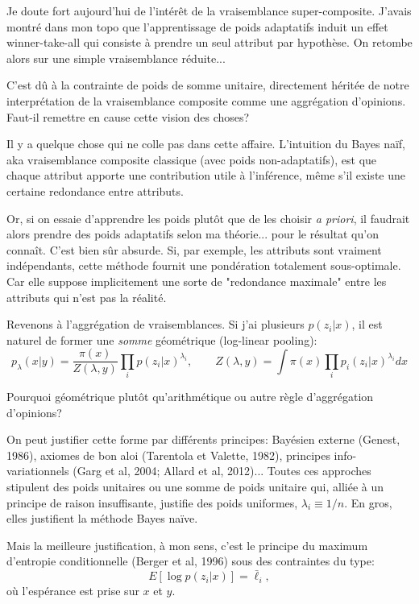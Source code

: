 \documentclass{article}
\begin{document}
Je doute fort aujourd'hui de l'int\'er\^et de la vraisemblance super-composite. J'avais montr\'e dans mon topo que l'apprentissage de poids adaptatifs induit un effet winner-take-all qui consiste \`a prendre un seul attribut par hypoth\`ese. On retombe alors sur une simple vraisemblance r\'eduite... 

C'est d\^u \`a la contrainte de poids de somme unitaire, directement h\'erit\'ee de notre interpr\'etation de la vraisemblance composite comme une aggr\'egation d'opinions. Faut-il remettre en cause cette vision des choses? 

Il y a quelque chose qui ne colle pas dans cette affaire. L'intuition du Bayes na\"if, aka vraisemblance composite classique (avec poids non-adaptatifs), est que chaque attribut apporte une contribution utile \`a l'inf\'erence, m\^eme s'il existe une certaine redondance entre attributs. 

Or, si on essaie d'apprendre les poids plut\^ot que de les choisir {\em a priori}, il faudrait alors prendre des poids adaptatifs selon ma th\'eorie... pour le r\'esultat qu'on conna\^it. C'est bien s\^ur absurde. Si, par exemple, les attributs sont vraiment ind\'ependants, cette m\'ethode fournit une pond\'eration totalement sous-optimale. Car elle suppose implicitement une sorte de "redondance maximale" entre les attributs qui n'est pas la r\'ealit\'e.

Revenons \`a l'aggr\'egation de vraisemblances. Si j'ai plusieurs $p(z_i|x)$, il est naturel de former une {\em somme} g\'eom\'etrique (log-linear pooling):
$$
p_\lambda(x|y) = \frac{\pi(x)}{Z(\lambda, y)}\prod_i p(z_i|x)^{\lambda_i},
\qquad 
Z(\lambda, y) = \int \pi(x) \prod_i p_i(z_i|x)^{\lambda_i} dx
$$

Pourquoi g\'eom\'etrique plut\^ot qu'arithm\'etique ou autre r\`egle d'aggr\'egation d'opinions?

On peut justifier cette forme par diff\'erents principes: Bay\'esien externe (Genest, 1986), axiomes de bon aloi (Tarentola et Valette, 1982), principes info-variationnels (Garg et al, 2004; Allard et al, 2012)... Toutes ces approches stipulent des poids unitaires ou une somme de poids unitaire qui, alli\'ee \`a un principe de raison insuffisante, justifie des poids uniformes, $\lambda_i\equiv 1/n$. En gros, elles justifient la m\'ethode Bayes na\"ive.

Mais la meilleure justification, \`a mon sens, c'est le principe du maximum d'entropie conditionnelle (Berger et al, 1996) sous des contraintes du type:
$$
E[\log p(z_i|x)] = \bar{\ell}_i,
$$
o\`u l'esp\'erance est prise sur $x$ et $y$. 
\end{document}
